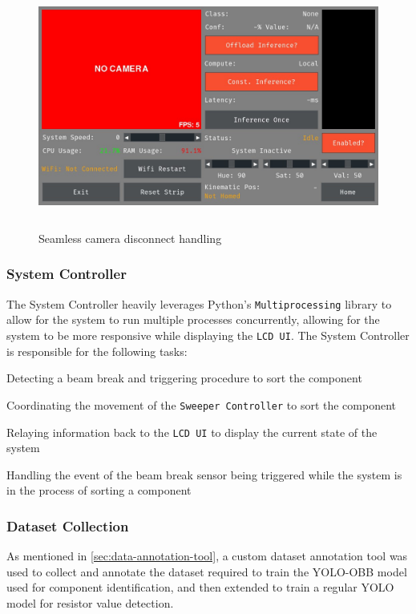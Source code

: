 \begin{figure}[H]
    \hfill
    \begin{minipage}[t]{\textwidth}
      \centering
      \includegraphics[height=8cm]{imgs/software/screen.jpg}
      \caption{Seamless camera disconnect handling}
      \label{fig:camera-disconnect}
    \end{minipage}
\end{figure}

\subsubsection{System Controller}
\label{sec:system-controller}
The System Controller heavily leverages Python's \texttt{Multiprocessing} library to allow for the system to run multiple processes concurrently, allowing for the system to be more responsive while displaying the \texttt{LCD UI}. The System Controller is responsible for the following tasks:

\begin{mylist}
    \item Detecting a beam break and triggering procedure to sort the component
    \item Coordinating the movement of the \texttt{Sweeper Controller} to sort the component
    \item Relaying information back to the \texttt{LCD UI} to display the current state of the system
    \item Handling the event of the beam break sensor being triggered while the system is in the process of sorting a component
\end{mylist}


\subsubsection{Dataset Collection}
\label{sec:dataset-collection}
As mentioned in \autoref{sec:data-annotation-tool}, a custom dataset annotation tool was used to collect and annotate the dataset required to train the YOLO-OBB model used for component identification, and then extended to train a regular YOLO model for resistor value detection.

